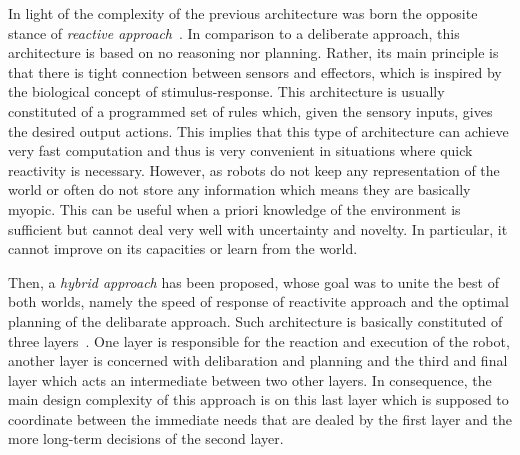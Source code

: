 
    In light of the complexity of the previous architecture was born the opposite stance of \emph{reactive approach}~\cite{Brooks1986}. In comparison to a deliberate approach, this architecture is based on no reasoning nor planning. Rather, its main principle is that there is tight connection between sensors and effectors, which is inspired by the biological concept of stimulus-response. This architecture is usually constituted of a programmed set of rules which, given the sensory inputs, gives the desired output actions. This implies that this type of architecture can achieve very fast computation and thus is very convenient in situations where quick reactivity is necessary. However, as robots do not keep any representation of the world or often do not store any information which means they are basically myopic. This can be useful when a priori knowledge of the environment is sufficient but cannot deal very well with uncertainty and novelty. In particular, it cannot improve on its capacities or learn from the world.

    Then, a \emph{hybrid approach} has been proposed, whose goal was to unite the best of both worlds, namely the speed of response of reactivite approach and the optimal planning of the delibarate approach. Such architecture is basically constituted of three layers~\cite{Mataric2008}. One layer is responsible for the reaction and execution of the robot, another layer is concerned with delibaration and planning and the third and final layer which acts an intermediate between two other layers. In consequence, the main design complexity of this approach is on this last layer which is supposed to coordinate between the immediate needs that are dealed by the first layer and the more long-term decisions of the second layer.

